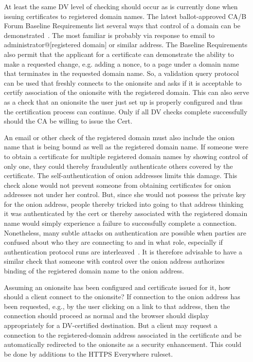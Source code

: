 \documentclass[10pt]{styles/IEEEtran}
\begin{document}
At least the same DV level of checking should occur as is currently
done when issuing certificates to registered domain names. The latest
ballot-approved CA/B Forum Baseline Requirements list several ways
that control of a domain can be demonstrated~\cite{cabforum-br}.  The
most familiar is probably via response to email to
administrator@[registered domain] or similar address.
The Baseline Requirements also permit
that the applicant for a certificate can demonstrate the ability
to make a requested change, e.g. adding a nonce, to a
page under a domain name that terminates in the requested domain name. 
So, a  validation query protocol can be used
that freshly connects to the onionsite and asks if it is acceptable to
certify association of the onionsite with the registered domain.  This
can also serve as a check that an onionsite the user just set up is
properly configured and thus the certification process can continue.
Only if all DV checks complete successfully should the CA be willing
to issue the Cert.


An email or other check of the registered domain must also include the
onion name that is being bound as well as the registered domain name.
If someone were to obtain a certificate for multiple registered domain
names by showing control of only one, they could thereby fraudulently
authenticate others covered by the certificate. The
self-authentication of onion addresses limits this damage.  This check
alone would not prevent someone from obtaining certificates for onion
addresses not under her control. But, since she would not possess the
private key for the onion address, people thereby tricked into going
to that address thinking it was authenticated by the cert or thereby
associated with the registered domain name would simply experience a
failure to successfully complete a connection. Nonetheless, many
subtle attacks on authentication are possible when parties are
confused about who they are connecting to and in what role, especially
if authentication protocol runs are interleaved~\cite{fosad00}.  It is
therefore advisable to have a similar check that someone with control
over the onion address authorizes binding of the registered domain
name to the onion address.



Assuming an onionsite has been configured and certificate issued for
it, how should a client connect to the onionsite? If connection
to the onion address has been requested, e.g., by the user
clicking on a link to that address, then the connection should
proceed as normal and the browser should display appropriately for a
DV-certified destination. But a client may request a connection
to the registered-domain address associated in the certificate
and be automatically redirected to the onionsite as a security
enhancement. This could be done by additions to the HTTPS Everywhere
ruleset.
\end{document}
